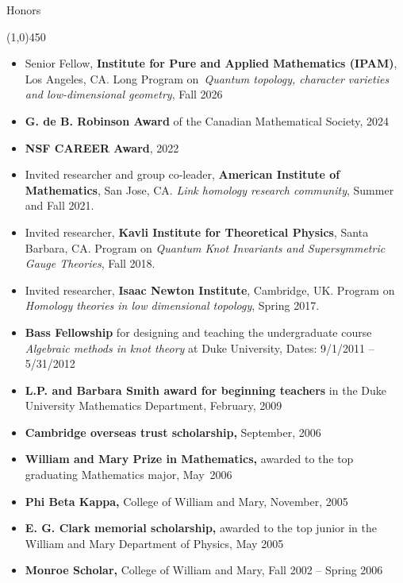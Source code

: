 \documentclass[10pt]{article}
\begin{document}
\newpage
\noindent
{\large \sc Honors}

\vspace{-0.1in}
\noindent
\line(1,0){450}

\smallskip

\begin{itemize}

\item Senior Fellow, {\bf Institute for Pure and Applied Mathematics (IPAM)}, Los Angeles, CA.
Long Program on \emph{Quantum topology, character varieties and low-dimensional geometry},
Fall 2026

\item \textbf{G. de B. Robinson Award} of the Canadian Mathematical Society,
2024

\item \textbf{NSF CAREER Award}, 2022

\item Invited researcher and group co-leader, {\bf American Institute of Mathematics}, San Jose, CA. 
\emph{Link homology research community}, Summer and Fall 2021.

\item Invited researcher, {\bf Kavli Institute for Theoretical Physics}, Santa Barbara, CA. 
Program on \emph{Quantum Knot Invariants and Supersymmetric Gauge Theories}, Fall 2018.

\item Invited researcher, {\bf Isaac Newton Institute}, Cambridge, UK.
Program on \emph{Homology theories in low dimensional topology}, Spring 2017.

\item {\bf Bass Fellowship} for designing and teaching the undergraduate course 
\emph{Algebraic methods in knot theory} at Duke University, 
Dates: 9/1/2011 -- 5/31/2012


\item {\bf L.P. and Barbara Smith award for beginning teachers} 
in the Duke University Mathematics Department, 
February, 2009
 
\item {\bf Cambridge overseas trust scholarship,} September, 2006
 
\item {\bf William and Mary Prize in Mathematics,} 
awarded to the top graduating Mathematics major, May~2006
 
\item {\bf Phi Beta Kappa,} College of William and Mary, November, 2005

\item {\bf E. G. Clark memorial scholarship,} 
awarded to the top junior in the William and Mary Department of Physics, May 2005

\item {\bf Monroe Scholar,} College of William and Mary, Fall 2002 -- Spring 2006 

\end{itemize}
\end{document}

